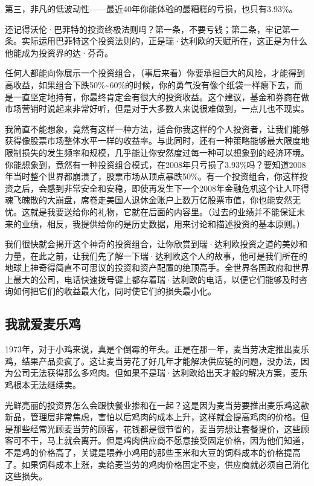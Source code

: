 第三，非凡的低波动性——最近40年你能体验的最糟糕的亏损，也只有3.93\%。

还记得沃伦·巴菲特的投资终极法则吗？第一条，不要亏钱；第二条，牢记第一条。实际运用巴菲特这个投资法则的，正是瑞·达利欧的天赋所在，这正是为什么他能成为投资界的达·芬奇。

任何人都能向你展示一个投资组合，（事后来看）你要承担巨大的风险，才能得到高收益，如果组合下跌50\%\textasciitilde{}60\%的时候，你的勇气没有像个纸袋一样瘪下去，而是一直坚定地持有，你最终肯定会有很大的投资收益。这个建议，基金和券商在做市场营销时说起来非常好听，但是对于大多数人来说很难做到，一点儿也不现实。

我简直不能想象，竟然有这样一种方法，适合你我这样的个人投资者，让我们能够获得像股票市场整体水平一样的收益率。与此同时，还有一种策略能够最大限度地限制损失的发生频率和规模，几乎能让你安然度过每一种可以想象到的经济环境。你能想象到，竟然有一种投资组合模式，在2008年只亏损了3.93\%吗？要知道2008年当时整个世界都崩溃了，股票市场从顶点暴跌50\%。有一个投资组合，你这样投资之后，会感到非常安全和安稳，即使再发生下一个2008年金融危机这个让人吓得魂飞魄散的大崩盘，席卷走美国人退休金账户上数万亿股票市值，你也能安然无忧。这就是我要送给你的礼物，它就在后面的内容里。（过去的业绩并不能保证未来的业绩，相反，我提供给你的是历史数据，用来讨论和描述投资的基本原则。）

我们很快就会揭开这个神奇的投资组合，让你欣赏到瑞·达利欧投资之道的美妙和力量，在此之前，让我们先了解一下瑞·达利欧这个人的故事，他可是我们所在的地球上神奇得简直不可思议的投资和资产配置的绝顶高手。全世界各国政府和世界上最大的公司，电话快速拨号键上都存着瑞·达利欧的电话，以便它们能够及时咨询如何把它们的收益最大化，同时使它们的损失最小化。

\subsection{我就爱麦乐鸡}

1973年，对于小鸡来说，真是个倒霉的年头。正是在那一年，麦当劳决定推出麦乐鸡，结果产品卖疯了。这让麦当劳花了好几年才能解决供应链的问题，没办法，因为公司无法获得那么多鸡肉。但如果不是瑞·达利欧给出天才般的解决方案，麦乐鸡根本无法继续卖。

光鲜亮丽的投资界怎么会跟快餐业掺和在一起？这是因为麦当劳要推出麦乐鸡这款新品，管理层非常焦虑，害怕以后鸡肉的成本上升，这样就会提高鸡肉的价格。但是那些经常光顾麦当劳的顾客，花钱都是很节省的，麦当劳想让套餐提价，这些顾客可不干，马上就会离开。但是鸡肉供应商不愿意接受固定价格，因为他们知道，不是鸡的价格高了，关键是喂养小鸡用的那些玉米和大豆的饲料成本的价格提高了。如果饲料成本上涨，卖给麦当劳的鸡肉价格固定不变，供应商就必须自己消化这些损失。

